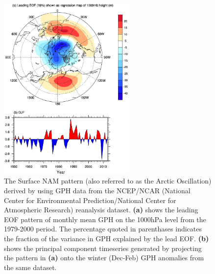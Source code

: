\begin{figure}[h!]
\centering
    \includegraphics[width=0.6\textwidth]{Figures/Figures-background/AO_pattern.jpg}
    \caption{The Surface NAM pattern (also referred to as the Arctic Oscillation) derived by \cite{hegyiDynamical2011b} using GPH data from the NCEP/NCAR (National Center for Environmental Prediction/National Center for Atmospheric Research) reanalysis dataset. \textbf{(a)} shows the leading EOF pattern of monthly mean GPH on the 1000hPa level from the 1979-2000 period. The percentage quoted in parenthases indicates the fraction of the variance in GPH explained by the lead EOF. \textbf{(b)} shows the principal component timeseries generated by projecting the pattern in \textbf{(a)} onto the winter (Dec-Feb) GPH anomalies from the same dataset.}
\centering
\label{fig:AO}
\end{figure}


